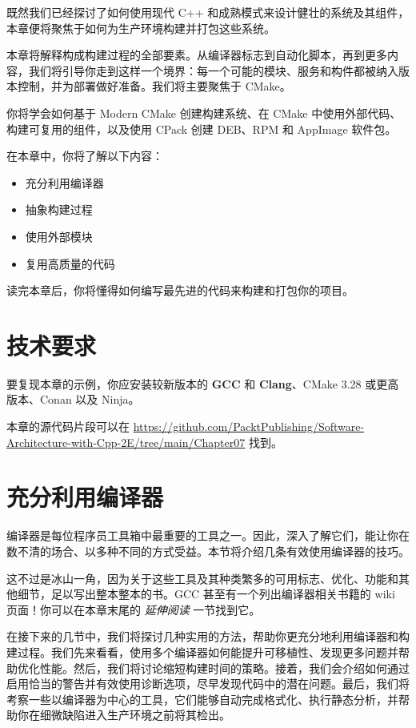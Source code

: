 既然我们已经探讨了如何使用现代 C++ 和成熟模式来设计健壮的系统及其组件，本章便将聚焦于如何为生产环境构建并打包这些系统。

本章将解释构成构建过程的全部要素。从编译器标志到自动化脚本，再到更多内容，我们将引导你走到这样一个境界：每一个可能的模块、服务和构件都被纳入版本控制，并为部署做好准备。我们将主要聚焦于 CMake。

你将学会如何基于 Modern CMake 创建构建系统、在 CMake 中使用外部代码、构建可复用的组件，以及使用 CPack 创建 DEB、RPM 和 AppImage 软件包。

在本章中，你将了解以下内容：

\begin{itemize}
\item 充分利用编译器
\item 抽象构建过程
\item 使用外部模块
\item 复用高质量的代码
\end{itemize}

读完本章后，你将懂得如何编写最先进的代码来构建和打包你的项目。

\section{技术要求}

要复现本章的示例，你应安装较新版本的 \textbf{GCC} 和 \textbf{Clang}、CMake 3.28 或更高版本、Conan 以及 Ninja。

本章的源代码片段可以在 \href{https://github.com/PacktPublishing/Software-Architecture-with-Cpp-2E/tree/main/Chapter07}{https://github.com/PacktPublishing/Software-Architecture-with-Cpp-2E/tree/main/Chapter07} 找到。

\section{充分利用编译器}

\label{idx:633}
编译器是每位程序员工具箱中最重要的工具之一。因此，深入了解它们，能让你在数不清的场合、以多种不同的方式受益。本节将介绍几条有效使用编译器的技巧。

这不过是冰山一角，因为关于这些工具及其种类繁多的可用标志、优化、功能和其他细节，足以写出整本整本的书。GCC 甚至有一个列出编译器相关书籍的 wiki 页面！你可以在本章末尾的 \emph{延伸阅读} 一节找到它。

在接下来的几节中，我们将探讨几种实用的方法，帮助你更充分地利用编译器和构建过程。我们先来看看，使用多个编译器如何能提升可移植性、发现更多问题并帮助优化性能。然后，我们将讨论缩短构建时间的策略。接着，我们会介绍如何通过启用恰当的警告并有效使用诊断选项，尽早发现代码中的潜在问题。最后，我们将考察一些以编译器为中心的工具，它们能够自动完成格式化、执行静态分析，并帮助你在细微缺陷进入生产环境之前将其检出。

